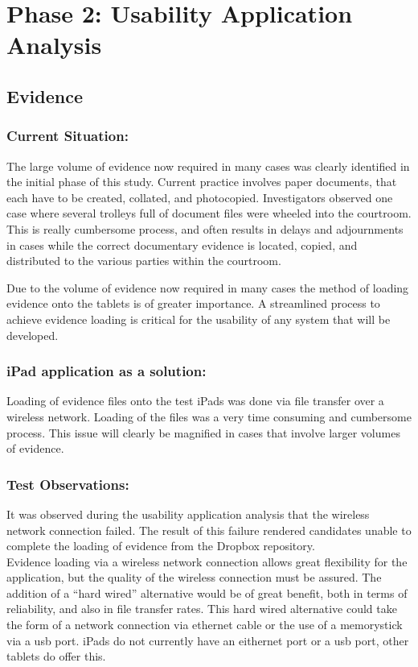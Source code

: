 \section{Phase 2: Usability Application Analysis\label{UsabilityApplicationAnalysis}} 
 \subsection{Evidence}
 \subsubsection{Current Situation:}
The large volume of evidence now required in many cases was clearly identified in the initial phase of this study. Current practice involves paper documents, that each have to be created, collated, and photocopied. Investigators observed one case where several trolleys full of document files were wheeled into the courtroom. This is really cumbersome process, and often results in delays and adjournments in cases while the correct documentary evidence is located, copied, and distributed to the various parties within the courtroom.

Due to the volume of evidence now required in many cases the method of loading evidence onto the tablets is of greater importance. A streamlined process to achieve evidence loading is critical for the usability of any system that will be developed.

\subsubsection{iPad application as a solution:}
Loading of evidence files onto the test iPads was done via file transfer over a wireless network. Loading of the files was a very time consuming and cumbersome process. This issue will clearly be magnified in cases that involve larger volumes of evidence.

\subsubsection{Test Observations:}
It was observed during the usability application analysis that the wireless network connection failed. The result of this failure rendered candidates unable to complete the loading of evidence from the Dropbox repository.\\
Evidence loading via a wireless network connection allows great flexibility for the application, but the quality of the wireless connection must be assured. The addition of a ``hard wired'' alternative would be of great benefit, both in terms of reliability, and also in file transfer rates. This hard wired alternative could take the form of a network connection via ethernet cable or the use of a memorystick via a usb port. iPads do not currently have an eithernet port or a usb port, other tablets do offer this.

